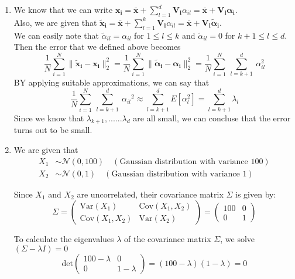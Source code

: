 \documentclass{article}
\begin{document}
\begin{enumerate}
\begin{enumerate}
    \item We know that we can write $\boldsymbol{x_i} = \boldsymbol{\bar{x}} + \sum_{l=1}^d \boldsymbol{V_l} \alpha_{il} = \boldsymbol{\bar{x}} + \boldsymbol{V_l}\boldsymbol{\alpha_{i}}$.\\Also, we are given that $\boldsymbol{\tilde{x}_i} = \boldsymbol{\bar{x}} + \sum_{l=1}^k \boldsymbol{V_l} \alpha_{il} = \boldsymbol{\bar{x}} + \boldsymbol{V_l}\boldsymbol{\tilde{\alpha}_{i}}$. \\We can easily note that $\tilde{\alpha}_{il} = \alpha_{il}$ for $1 \leq l \leq k$ and $\tilde{\alpha}_{il} = 0$ for $k+1 \leq l \leq d$.\\ Then the error that we defined above becomes
    \[ \frac{1}{N} \sum_{i=1}^N \|\boldsymbol{\tilde{x}_i} - \boldsymbol{x_i}\|^2_2 =  \frac{1}{N} \sum_{i=1}^N \|\boldsymbol{\tilde{\alpha}_i} - \boldsymbol{\alpha_i}\|^2_2 = \frac{1}{N} \sum_{i=1}^N\ \sum_{l=k+1}^d \ {\alpha^2_{il}}
    \]
    BY applying suitable approximations, we can say that 
    \[
    \frac{1}{N} \sum_{i=1}^N\ \sum_{l=k+1}^d \ {\alpha_{il}}^2 \approx \sum_{l=k+1}^d E[{\alpha^2_l}] = \sum_{l=k+1}^d \lambda_l
    \]
    Since we know that $\lambda_{k+1}, ...... \lambda_d$ are all small, we can concluse that the error turns out to be small.
    \item We are given that
        \begin{align*}
            X_1 & \sim \mathcal{N}(0, 100) \quad (\text{Gaussian distribution with variance } 100) \\
            X_2 & \sim \mathcal{N}(0, 1) \quad (\text{Gaussian distribution with variance } 1)
        \end{align*}

        Since \(X_1\) and \(X_2\) are uncorrelated, their covariance matrix \(\Sigma\) is given by:
        \[
            \Sigma
            =
            \begin{pmatrix}
            \text{Var}(X_1) & \text{Cov}(X_1, X_2) \\
            \text{Cov}(X_1, X_2) & \text{Var}(X_2)
            \end{pmatrix}
            =
            \begin{pmatrix}
            100 & 0 \\
            0 & 1
            \end{pmatrix}
        \]
        
        To calculate the eigenvalues \(\lambda\) of the covariance matrix \(\Sigma\), we solve $(\Sigma - \lambda I) = 0$
        \[
            \text{det}
            \begin{pmatrix}
            100 - \lambda & 0 \\
            0 & 1 - \lambda
            \end{pmatrix} = (100 - \lambda)(1 - \lambda) = 0
        \]


\end{enumerate}
\end{enumerate}
\end{document}
